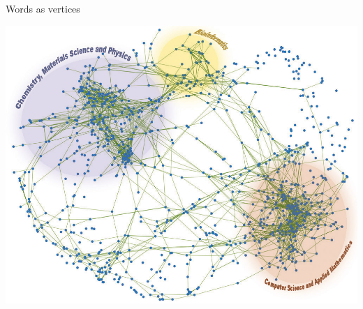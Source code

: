 \documentclass{lecture}
\begin{document}
\begin{plain}{Words as vertices}
\begin{center}
\includegraphics[scale=2.1]{figs/vertices2}
\end{center}
\end{plain}
\end{document}
